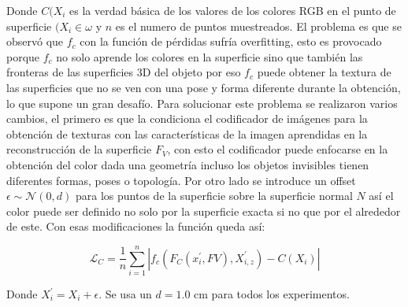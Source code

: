 Donde $C(X_{i}$ es la verdad básica de los valores de los colores RGB en el punto de superficie $(X_{i} \in \omega$ y $n$ es el numero de puntos muestreados. El problema es que se observó que $f_{c}$ con la función de pérdidas sufría overfitting, esto es provocado porque $f_{c}$ no solo aprende los colores en la superficie sino que también las fronteras de las superficies 3D del objeto por eso $f_{c}$ puede obtener la textura de las  superficies que no se ven con una pose y forma diferente durante la obtención, lo que supone un gran desafío. Para solucionar este problema se realizaron varios cambios, el primero es que la condiciona el codificador de imágenes para la obtención de texturas con las características de la imagen aprendidas en la reconstrucción de la superficie $F_{V}$, con esto el codificador puede enfocarse en la obtención del color dada una geometría incluso los objetos invisibles tienen diferentes formas, poses o topología. Por otro lado se introduce un offset $\epsilon \sim \mathcal{N}(0, d)$ para los puntos de la superficie sobre la superficie normal $N$ así el color puede ser definido no solo por la superficie exacta si no que por el alrededor de este. Con esas modificaciones la función queda así:

\begin{equation}
	\label{eq:5}
	\mathcal{L}_{C} = \frac{1}{n} 
	\sum_{i=1}^{n} | f_{c} (F_{C}(x_{i}^{'}, F{V}), X_{i,z}^{'}) - C(X_{i}) |
\end{equation}

Donde $ X_{i}^{'} = X_{i} + \epsilon$. Se usa un $d = 1.0$ cm para todos los experimentos.

\clearpage
